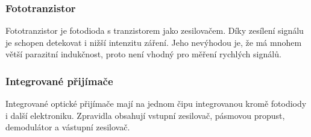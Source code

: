 \subsubsection{Fototranzistor}
Fototranzistor je fotodioda s tranzistorem jako zesilovačem. Díky zesílení signálu je schopen detekovat i nižší intenzitu záření. Jeho nevýhodou je, že má mnohem větší parazitní indukčnost, proto není vhodný pro měření rychlých signálů.

\subsubsection{Integrované přijímače}
Integrované optické přijímače mají na jednom čipu integrovanou kromě fotodiody i další elektroniku. Zpravidla obsahují vstupní zesilovač, pásmovou propust, demodulátor a vástupní zesilovač.
